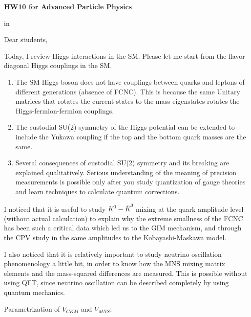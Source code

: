 \documentclass[12pt]{article}
\begin{document}
\begin{center}
{\large\bf HW10 for Advanced Particle Physics} \\

\end{center}

 in

Dear students,

  Today, I review Higgs interactions in the SM.  Please let me start
  from the flavor diagonal Higgs couplings in the SM.



  \begin{enumerate}
      \item The SM Higgs boson does not have couplings between quarks and leptons
      of different generations (absence of FCNC).  This is because the same
      Unitary matrices that rotates the current states to the mass
      eigenstates rotates the Higgs-fermion-fermion couplings.
      \item The custodial SU(2) symmetry of the Higgs potential can be extended
      to include the Yukawa coupling if the top and the bottom quark masses
      are the same.
      \item Several consequences of custodial SU(2) symmetry and its breaking
      are explained qualitatively.  Serious understanding of the meaning of
      precision measurements is possible only after you study quantization
      of gauge theories and learn techniques to calculate quantum corrections.
      
  \end{enumerate}

  I noticed that it is useful to study $K^0-{\overline K^0}$ mixing at the quark
  amplitude level (without actual calculation) to explain why the
  extreme smallness of the FCNC has been such a critical data which
  led us to the GIM mechanism, and through the CPV study in the same
  amplitudes to the Kobayashi-Maskawa model.

  I also noticed that it is relatively important to study neutrino
  oscillation phenomenology a little bit, in order to know how the
  MNS mixing matrix elements and the mass-squared differences are
  measured.  This is possible without using QFT, since neutrino
  oscillation can be described completely by using quantum mechanics.

  Parametrization of $V_{CKM}$ and $V_{MNS}$:
\end{document}
